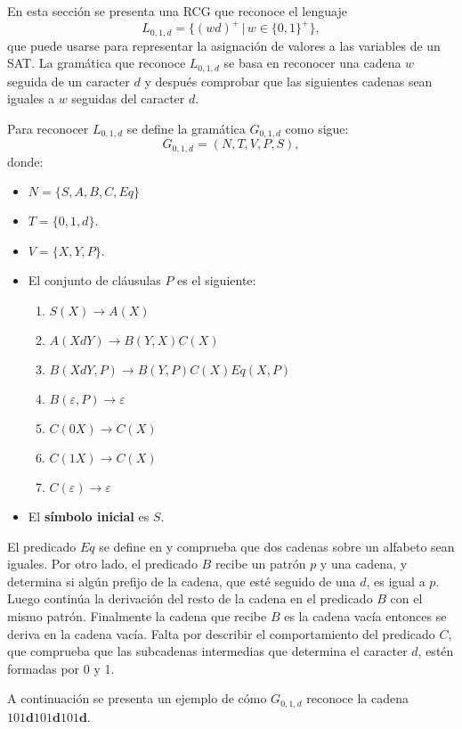 En esta sección se presenta una RCG que reconoce el lenguaje $$L_{0,1,d}=\{(wd)^+\,|\,w\in\{0,1\}^+\},$$ que puede usarse para representar la asignación de valores a las variables de un SAT. La gramática que reconoce $L_{0,1,d}$ se basa en reconocer una cadena $w$ seguida de un caracter $d$ y después comprobar que las siguientes cadenas sean iguales a $w$ seguidas del caracter $d$.

Para reconocer $L_{0,1,d}$ se define la gramática $G_{0,1,d}$ como sigue:
\[
    G_{0,1,d} = (N, T, V, P, S),
\]
donde:

\begin{itemize}
    \item $N=\{S,A,B,C,Eq\}$
    \item $T=\{0,1,d\}$.
    \item $V=\{X,Y,P\}$.
    \item El conjunto de cláusulas $P$ es el siguiente:
          \begin{enumerate}
              \item $S(X)\to A(X)$
              \item $A(XdY)\to B(Y,X)C(X)$
              \item $B(XdY,P)\to B(Y,P) C(X) Eq(X,P)$
              \item $B(\varepsilon,P)\to \varepsilon$
              \item $C(0X)\to C(X)$
              \item $C(1X)\to C(X)$
              \item $C(\varepsilon)\to \varepsilon$
          \end{enumerate}
    \item El \textbf{símbolo inicial} es $S$.
\end{itemize}

El predicado $Eq$ se define en \cite{mainRCGBib} y comprueba que dos cadenas sobre un alfabeto sean iguales.  
Por otro lado, el predicado $B$ recibe un patrón $p$ y una cadena, y determina si algún prefijo de la cadena, 
que esté seguido de una $d$, es igual a  $p$. Luego continúa la derivación del resto de la cadena en el predicado 
$B$ con el mismo patrón. Finalmente la cadena que recibe $B$ es la cadena vacía entonces se deriva en la 
cadena vacía. Falta por describir el comportamiento del predicado $C$, que comprueba que las subcadenas intermedias que determina
el caracter $d$, estén formadas por 0 y 1.

A continuación se presenta un ejemplo de cómo $G_{0,1,d}$ reconoce la cadena $101\mathbf{d}101\mathbf{d}101\mathbf{d}$.

